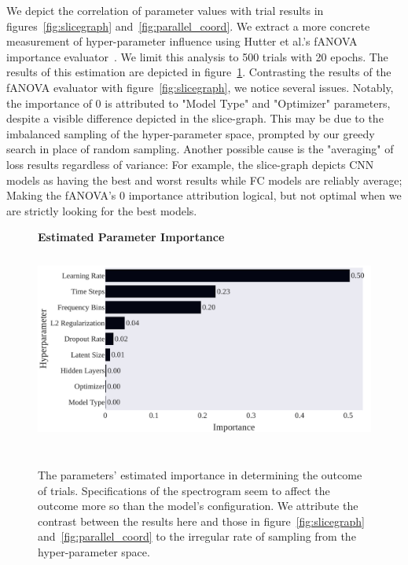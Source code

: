 \documentclass[\main/thesis.tex]{subfiles}
\begin{document}
We depict the correlation of parameter values with trial results in figures~\ref{fig:slicegraph} and~\ref{fig:parallel_coord}. We extract a more concrete measurement of hyper-parameter influence using Hutter et al.'s fANOVA importance evaluator~\cite{hutter2014efficient}. We limit this analysis to 500 trials with 20 epochs. The results of this estimation are depicted in figure~\ref{chap3:param_importance}. Contrasting the results of the fANOVA evaluator with figure~\ref{fig:slicegraph}, we notice several issues. Notably, the importance of 0 is attributed to "Model Type" and "Optimizer" parameters, despite a visible difference depicted in the slice-graph. This may be due to the imbalanced sampling of the hyper-parameter space, prompted by our greedy search in place of random sampling. Another possible cause is the "averaging" of loss results regardless of variance: For example, the slice-graph depicts CNN models as having the best and worst results while FC models are reliably average; Making the fANOVA's 0 importance attribution logical, but not optimal when we are strictly looking for the best models. 

\begin{figure}[t!]
\centering
\textbf{Estimated Parameter Importance}
\includegraphics[width=14cm,height=7cm]{images/chapter_3/ParameterImportances_final.pdf}
\caption{The parameters' estimated importance in determining the outcome of trials. Specifications of the spectrogram seem to affect the outcome more so than the model's configuration. We attribute the contrast between the results here and those in figure~\ref{fig:slicegraph} and~\ref{fig:parallel_coord} to the irregular rate of sampling from the hyper-parameter space.}
\label{chap3:param_importance}
\end{figure}
\end{document}
